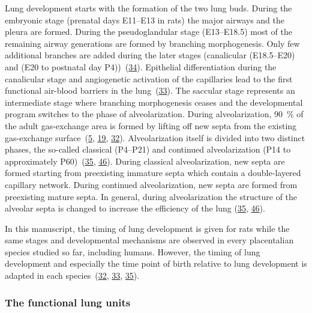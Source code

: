 \documentclass[
  american,
]{article}
\begin{document}
Lung development starts with the formation of the two lung buds.
During the embryonic stage (prenatal days E11--E13 in rats) the major airways and the pleura are formed.
During the pseudoglandular stage (E13--E18.5) most of the remaining airway generations are formed by branching morphogenesis.
Only few additional branches are added during the later stages (canalicular (E18.5--E20) and (E20 to postnatal day P4))~(\protect\hyperlink{ref-TsNwin2E}{34}).
Epithelial differentiation during the canalicular stage and angiogenetic activation of the capillaries lead to the first functional air-blood barriers in the lung~(\protect\hyperlink{ref-ODQCVC23}{33}).
The saccular stage represents an intermediate stage where branching morphogenesis ceases and the developmental program switches to the phase of alveolarization.
During alveolarization, 90~\% of the adult gas-exchange area is formed by lifting off new septa from the existing gas-exchange surface~(\protect\hyperlink{ref-auNiE56G}{5}, \protect\hyperlink{ref-1AhvLCPky}{19}, \protect\hyperlink{ref-XQLPrPTJ}{32}).
Alveolarization itself is divided into two distinct phases, the so-called classical (P4--P21) and continued alveolarization (P14 to approximately P60)~(\protect\hyperlink{ref-d1YV8oOK}{35}, \protect\hyperlink{ref-wnl86DEM}{46}).
During classical alveolarization, new septa are formed starting from preexisting immature septa which contain a double-layered capillary network.
During continued alveolarization, new septa are formed from preexisting mature septa.
In general, during alveolarization the structure of the alveolar septa is changed to increase the efficiency of the lung (\protect\hyperlink{ref-d1YV8oOK}{35}, \protect\hyperlink{ref-wnl86DEM}{46}).

In this manuscript, the timing of lung development is given for rats while the same stages and developmental mechanisms are observed in every placentalian species studied so far, including humans.
However, the timing of lung development and especially the time point of birth relative to lung development is adapted in each species~(\protect\hyperlink{ref-XQLPrPTJ}{32}, \protect\hyperlink{ref-ODQCVC23}{33}, \protect\hyperlink{ref-d1YV8oOK}{35}).

\hypertarget{the-functional-lung-units}{%
\subsubsection{The functional lung units}\label{the-functional-lung-units}}
\end{document}
